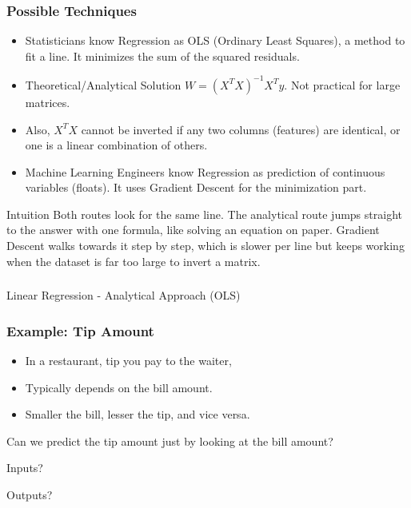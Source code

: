\begin{frame}[fragile]\frametitle{Possible Techniques}
\begin{itemize}
\item Statisticians know Regression as OLS (Ordinary Least Squares), a method to fit a line. It minimizes the sum of the squared residuals.
\item Theoretical/Analytical Solution $W = (X^TX)^{-1} X^T y$. Not practical for large matrices.
\item Also, $X^TX$ cannot be inverted if any two columns (features) are identical, or one is a linear combination of others.
\item Machine Learning Engineers know Regression as prediction of continuous variables (floats). It uses Gradient Descent for the minimization part.
\end{itemize}

\begin{block}{Intuition}
Both routes look for the same line. The analytical route jumps straight to the answer with one formula, like solving an equation on paper. Gradient Descent walks towards it step by step, which is slower per line but keeps working when the dataset is far too large to invert a matrix.
\end{block}
\end{frame}

\begin{frame}[fragile]\frametitle{}
\begin{center}
{\Large Linear Regression - Analytical Approach (OLS)}
\end{center}
\end{frame}



\begin{frame}[fragile]\frametitle{Example: Tip Amount}
\begin{itemize}
\item In a restaurant, tip you pay to the waiter, 
\item Typically depends on the bill amount.
\item Smaller the bill, lesser the tip, and vice versa.
\end{itemize}

Can we predict the tip amount just by looking at the bill amount?

Inputs?

Outputs?
\end{frame}

